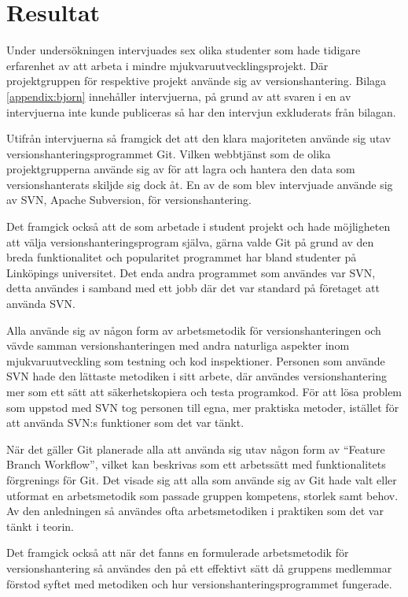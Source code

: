 \section{Resultat}
Under undersökningen intervjuades sex olika studenter som hade tidigare erfarenhet av att arbeta i mindre mjukvaruutvecklingsprojekt. Där projektgruppen för respektive projekt använde sig av versionshantering. Bilaga \ref{appendix:bjorn} innehåller intervjuerna, på grund av att svaren i en av intervjuerna inte kunde publiceras så har den intervjun exkluderats från bilagan.

Utifrån intervjuerna så framgick det att den klara majoriteten använde sig utav versionshanteringsprogrammet Git. Vilken webbtjänst som de olika projektgrupperna använde sig av för att lagra och hantera den data som versionshanterats skiljde sig dock åt. En av de som blev intervjuade använde sig av SVN, Apache Subversion, för versionshantering.\cite{VersionControlSvn}

Det framgick också att de som arbetade i student projekt och hade möjligheten att välja versionshanteringsprogram själva, gärna valde Git på grund av den breda funktionalitet och popularitet programmet har bland studenter på Linköpings universitet. Det enda andra programmet som användes var SVN, detta användes i samband med ett jobb där det var standard på företaget att använda SVN.

Alla använde sig av någon form av arbetsmetodik för versionshanteringen och vävde samman versionshanteringen med andra naturliga aspekter inom mjukvaruutveckling som testning och kod inspektioner. Personen som använde SVN hade den lättaste metodiken i sitt arbete, där användes versionshantering mer som ett sätt att säkerhetskopiera och testa programkod. För att lösa problem som uppstod med SVN tog personen till egna, mer praktiska metoder, istället för att använda SVN:s funktioner som det var tänkt.

 När det gäller Git planerade alla att använda sig utav någon form av ``Feature Branch Workflow'', vilket kan beskrivas som ett arbetssätt med funktionalitets förgrenings för Git. Det visade sig att alla som använde sig av Git hade valt eller utformat en arbetsmetodik som passade gruppen kompetens, storlek samt behov. Av den anledningen så användes ofta arbetsmetodiken i praktiken som det var tänkt i teorin.

 Det framgick också att när det fanns en formulerade arbetsmetodik för versionshantering så användes den på ett effektivt sätt då gruppens medlemmar förstod syftet med metodiken och hur versionshanteringsprogrammet fungerade.

